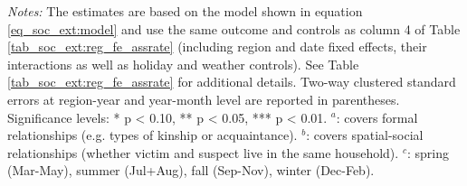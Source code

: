 \begin{table}[ht]
\begin{threeparttable}
{\begin{tabular}{l*{6}{c}}
				
				\bottomrule 
		\end{tabular}}
		\begin{tablenotes} 
			\item \scriptsize \emph{Notes:} The estimates are based on the model shown in equation \ref{eq_soc_ext:model} and use the same outcome and controls as column 4 of Table \ref{tab_soc_ext:reg_fe_assrate} (including region and date fixed effects, their interactions as well as holiday and weather controls). See Table \ref{tab_soc_ext:reg_fe_assrate} for additional details. Two-way clustered standard errors at region-year and year-month level are reported in parentheses. \newline Significance levels: * p < 0.10, ** p < 0.05, *** p < 0.01.\newline \hspace*{15pt} $^a$: covers formal relationships (e.g. types of kinship or acquaintance). \newline \hspace*{15pt} $^b$: covers spatial-social relationships (whether victim and suspect live in the same household). \newline \hspace*{15pt} $^c$: spring (Mar-May), summer (Jul+Aug), fall (Sep-Nov), winter (Dec-Feb).
		\end{tablenotes} 
	\end{threeparttable} 
\end{table}




